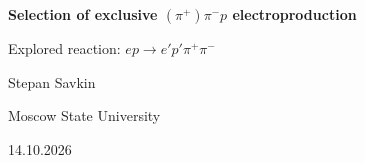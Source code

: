 {
    \begin{frame}
    
        \centering
    
        \vspace{1.5cm}
    
        {
            \color{myblue}
    
            {\LARGE \textbf{Selection of exclusive $(\pi^+)\pi^-p$ electroproduction}}
    
            \vspace{0.7cm}
    
            {\large Explored reaction: $ep \rightarrow e'p'\pi^+\pi^-$}
        }
    
        \vfill
    
        {\large Stepan Savkin}
    
        \vspace{0.2cm}
    
        Moscow State University
    
        \vspace{0.3cm}
    
        14.10.2026
    \end{frame}
}